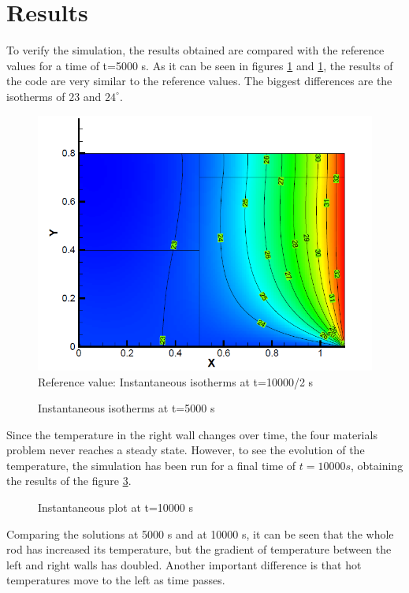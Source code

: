 \section{Results}
To verify the simulation, the results obtained are compared with the reference values for a time of t=5000 s. As it can be seen in figures \ref{ref4M} and \ref{ref4M}, the results of the code are very similar to the reference values. The biggest differences are the isotherms of $23$ and $24^{\circ}$.
\begin{figure}[h!]
	\centering
	\includegraphics[scale=0.55]{FourMaterials/reference}
	\caption{Reference value: Instantaneous isotherms at t=10000/2 s}
	\label{ref4M}
\end{figure}
\begin{figure}[h!]
	\centering
	
	\caption{Instantaneous isotherms at t=5000 s}
	\label{plot4M}
\end{figure}

Since the temperature in the right wall changes over time, the four materials problem never reaches a steady state. However, to see the evolution of the temperature, the simulation has been  run for a final time of $t=10000 s$, obtaining the results of the figure \ref{4Mfinal}.
\begin{figure}[h]
	\centering
	
	\caption{Instantaneous plot at t=10000 s}
	\label{4Mfinal}
\end{figure}

Comparing the solutions at 5000 s and at 10000 s, it can be seen that the whole rod has increased its temperature, but the gradient of temperature between the left and right walls has doubled. Another important difference is that hot temperatures move to the left as time passes.

